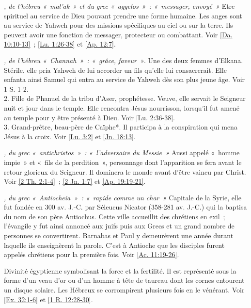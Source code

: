 \begin{multicols}{2}
\textit{, de l'hébreu «~mal'ak~» et du grec «~aggelos~»~: «~messager, envoyé~»}\newline
Etre spirituel au service de Dieu pouvant prendre une forme humaine. Les anges sont au service de Yahweh pour des missions spécifiques au ciel ou sur la terre. Ils peuvent avoir une fonction de messager, protecteur ou combattant. Voir \vref{Da. 10:10-13}~; \vref{Lu. 1:26-38} et \vref{Ap. 12:7}.

\textit{, de l'hébreu «~Channah~»~: «~grâce, faveur~»}. Une des deux femmes d'Elkana. Stérile, elle pria Yahweh de lui accorder un fils qu'elle lui consacrerait. Elle enfanta ainsi Samuel qui entra au service de Yahweh dès son plus jeune âge. Voir 1 S. 1-2.
\\2. Fille de Phanuel de la tribu d'Aser, prophétesse. Veuve, elle servait le Seigneur nuit et jour dans le temple. Elle rencontra Jésus nourrisson, lorsqu'il fut amené au temple pour y être présenté à Dieu. Voir \vref{Lu. 2:36-38}.
\\3. Grand-prêtre, beau-père de Caïphe*. Il participa à la conspiration qui mena Jésus à la croix. Voir \vref{Lu. 3:2} et \vref{Jn. 18:13}.

\textit{, du grec «~antichristos~»~: «~l'adversaire du Messie~»}\newline
Aussi appelé «~homme impie~» et «~fils de la perdition~», personnage dont l'apparition se fera avant le retour glorieux du Seigneur. Il dominera le monde avant d'être vaincu par Christ. Voir \vref{2 Th. 2:1-4}~; \vref{2 Jn. 1:7} et \vref{Ap. 19:19-21}.

\textit{, du grec «~Antiocheia~»~: «~rapide comme un char~»}\newline
Capitale de la Syrie, elle fut fondée en 300 av. J.-C. par Séleucus Nicator (358-281 av. J.-C.) qui la baptisa du nom de son père Antiochus. Cette ville accueillit des chrétiens en exil~; l'évangile y fut ainsi annoncé aux juifs puis aux Grecs et un grand nombre de personnes se convertirent. Barnabas et Paul y demeurèrent une année durant laquelle ils enseignèrent la parole. C'est à Antioche que les disciples furent appelés chrétiens pour la première fois. Voir \vref{Ac. 11:19-26}.

\textit{}\newline
Divinité égyptienne symbolisant la force et la fertilité. Il est représenté sous la forme d'un veau d'or ou d'un homme à tête de taureau dont les cornes entourent un disque solaire. Les Hébreux se corrompirent plusieurs fois en le vénérant. Voir \vref{Ex. 32:1-6} et \vref{1 R. 12:28-30}.


\end{multicols}
